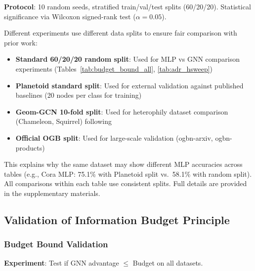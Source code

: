 \textbf{Protocol}: 10 random seeds, stratified train/val/test splits (60/20/20). Statistical significance via Wilcoxon signed-rank test ($\alpha = 0.05$).

\begin{remark}
\label{rem:data_splits}
Different experiments use different data splits to ensure fair comparison with prior work:
\begin{itemize}
    \item \textbf{Standard 60/20/20 random split}: Used for MLP vs GNN comparison experiments (Tables~\ref{tab:budget_bound_all}, \ref{tab:adr_hsweep})
    \item \textbf{Planetoid standard split}: Used for external validation against published baselines (20 nodes per class for training)
    \item \textbf{Geom-GCN 10-fold split}: Used for heterophily dataset comparison (Chameleon, Squirrel) following~\cite{pei2020geom}
    \item \textbf{Official OGB split}: Used for large-scale validation (ogbn-arxiv, ogbn-products)
\end{itemize}
This explains why the same dataset may show different MLP accuracies across tables (e.g., Cora MLP: 75.1\% with Planetoid split vs.\ 58.1\% with random split). All comparisons within each table use consistent splits. Full details are provided in the supplementary materials.
\end{remark}

\subsection{Validation of Information Budget Principle}

\subsubsection{Budget Bound Validation}

\textbf{Experiment}: Test if GNN advantage $\leq$ Budget on all datasets.

